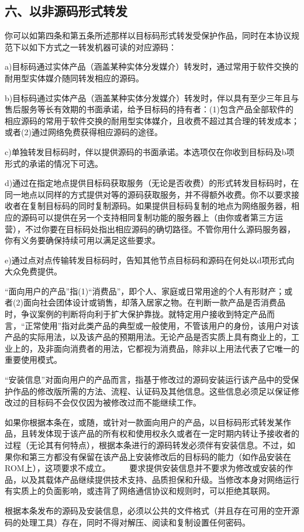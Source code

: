 \subsection{六、以非源码形式转发}
你可以如第四条和第五条所述那样以目标码形式转发受保护作品，同时在本协议规范下以如下方式之一转发机器可读的对应源码：\par
a)目标码通过实体产品（涵盖某种实体分发媒介）转发时，通过常用于软件交换的耐用型实体媒介随同转发相应的源码。\par
b)目标码通过实体产品（涵盖某种实体分发媒介）转发时，伴以具有至少三年且与售后服务等长有效期的书面承诺，给予目标码的持有者：(1)包含产品全部软件的相应源码的常用于软件交换的耐用型实体媒介，且收费不超过其合理的转发成本；或者(2)通过网络免费获得相应源码的途径。\par
c)单独转发目标码时，伴以提供源码的书面承诺。本选项仅在你收到目标码及b项形式的承诺的情况下可选。\par
d)通过在指定地点提供目标码获取服务（无论是否收费）的形式转发目标码时，在同一地点以同样的方式提供对等的源码获取服务，并不得额外收费。你不以要求接收者在复制目标码的同时复制源码。如果提供目标码复制的地点为网络服务器，相应的源码可以提供在另一个支持相同复制功能的服务器上（由你或者第三方运营），不过你要在目标码处指出相应源码的确切路径。不管你用什么源码服务器，你有义务要确保持续可用以满足这些要求。\par
e)通过点对点传输转发目标码时，告知其他节点目标码和源码在何处以d项形式向大众免费提供。\par
“面向用户的产品”指(1)“消费品”，即个人、家庭或日常用途的个人有形财产；或者(2)面向社会团体设计或销售，却落入居家之物。在判断一款产品是否消费品时，争议案例的判断将向利于扩大保护靠拢。就特定用户接收到特定产品而言，“正常使用”指对此类产品的典型或一般使用，不管该用户的身份，该用户对该产品的实际用法，以及该产品的预期用法。无论产品是否实质上具有商业上的，工业上的，及非面向消费者的用法，它都视为消费品，除非以上用法代表了它唯一的重要使用模式。\par
“安装信息”对面向用户的产品而言，指基于修改过的源码安装运行该产品中的受保护作品的修改版所需的方法、流程、认证码及其他信息。这些信息必须足以保证修改过的目标码不会仅仅因为被修改过而不能继续工作。\par
如果你根据本条在，或随，或针对一款面向用户的产品，以目标码形式转发某作品，且转发体现于该产品的所有权和使用权永久或者在一定时期内转让予接收者的过程（无论其有何特点），根据本条进行的源码转发必须伴有安装信息。不过，如果你和第三方都没有保留在该产品上安装修改后的目标码的能力（如作品安装在ROM上），这项要求不成立。 　　要求提供安装信息并不要求为修改或安装的作品，以及其载体产品继续提供技术支持、品质担保和升级。当修改本身对网络运行有实质上的负面影响，或违背了网络通信协议和规则时，可以拒绝其联网。\par
根据本条发布的源码及安装信息，必须以公共的文件格式（并且存在可用的空开源码的处理工具）存在，同时不得对解压、阅读和复制设置任何密码。
